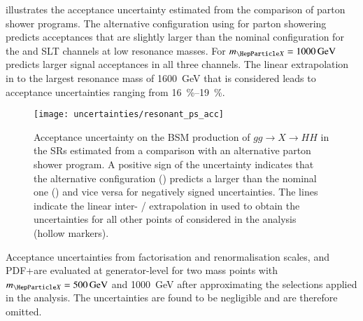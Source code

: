  illustrates the acceptance uncertainty
estimated from the comparison of parton shower programs. The alternative
configuration using \PYTHIA for parton showering predicts acceptances that are
slightly larger than the nominal configuration for the \hadhad and \lephad SLT
channels at low resonance masses. For $\mX = \SI{1000}{\GeV}$ \HERWIG predicts
larger signal acceptances in all three channels. The linear extrapolation in \mX
to the largest resonance mass of \SI{1600}{\GeV} that is considered leads to
acceptance uncertainties ranging from \SIrange{16}{19}{\percent}.


%   


\begin{figure}[htbp]
  \centering

  \texttt{[image: uncertainties/resonant\_ps\_acc]}

  \caption{Acceptance uncertainty on the BSM production of $gg \to X \to HH$ in
    the SRs estimated from a comparison with an alternative parton shower
    program. A positive sign of the uncertainty indicates that the alternative
    configuration (\PYTHIA) predicts a larger \AccTimesEff than the nominal one
    (\HERWIG) and vice versa for negatively signed uncertainties. The lines
    indicate the linear inter- / extrapolation in \mX used to obtain the
    uncertainties for all other points of \mX considered in the analysis (hollow
    markers).}
  \label{fig:resonant_partonshower}
\end{figure}

Acceptance uncertainties from factorisation and renormalisation scales, and
PDF+\alphas are evaluated at generator-level for two mass points with
$\mX = \SI{500}{\GeV}$ and \SI{1000}{\GeV} after approximating the selections
applied in the analysis. The uncertainties are found to be negligible and are
therefore omitted.

